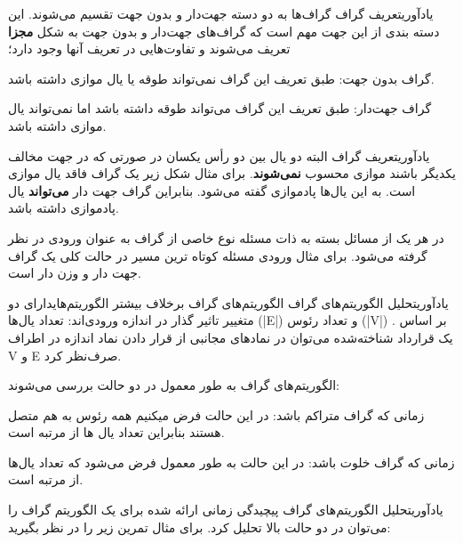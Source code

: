 \begin{itemframe-s}{یادآوری}{تعریف گراف}
\itm
گراف‌ها به دو دسته جهت‌دار و بدون جهت تقسیم می‌شوند. این دسته بندی از این جهت مهم است که گراف‌های جهت‌دار و بدون جهت به شکل \textbf{مجزا} تعریف می‌شوند و تفاوت‌هایی در تعریف آنها وجود دارد؛
\item[۱]
گراف بدون جهت: طبق تعریف این گراف نمی‌تواند طوقه یا یال موازی داشته باشد.
\item[۲]
گراف جهت‌دار: طبق تعریف این گراف می‌تواند طوقه داشته باشد اما نمی‌تواند یال موازی داشته باشد.

\end{itemframe-s}
\begin{itemframe-s}{یادآوری}{تعریف گراف}
\itm
البته دو یال بین دو رأس یکسان در صورتی که در جهت مخالف یکدیگر باشند موازی محسوب \textbf{نمی‌شوند}. برای مثال شکل زیر یک گراف فاقد یال موازی است.
\itm
 به این یال‌ها پادموازی
 گفته می‌شود. بنابراین گراف جهت دار \textbf{می‌تواند} یال پادموازی داشته باشد.

\itm
در هر یک از مسائل بسته به ذات مسئله نوع خاصی از گراف به عنوان ورودی در نظر گرفته می‌شود. برای مثال ورودی مسئله کوتاه ترین مسیر در حالت کلی یک گراف جهت دار و وزن دار است.
\end{itemframe-s}

\begin{itemframe-s}{یادآوری}{تحلیل الگوریتم‌های گراف}
\itm
الگوریتم‌های گراف برخلاف بیشتر الگوریتم‌هایدارای دو متغییر تاثیر گذار در اندازه ورودی‌اند: تعداد یال‌ها (|E|) و تعداد رئوس (|V|) .
\itm
بر اساس یک قرارداد شناخته‌شده می‌توان در نمادهای مجانبی از قرار دادن نماد اندازه در اطراف V و E صرف‌نظر ‌کرد.

\itm
الگوریتم‌های گراف به طور معمول در دو حالت بررسی می‌شوند:
\item[الف]
زمانی که گراف متراکم باشد: در این حالت فرض میکنیم همه رئوس به هم متصل هستند بنابراین تعداد یال ها از مرتبه
است.
\item[ب]
زمانی که گراف خلوت باشد:‌ در این حالت به طور معمول فرض می‌شود که تعداد یال‌ها از مرتبه
است.
\end{itemframe-s}

\begin{itemframe-s}{یادآوری}{تحلیل الگوریتم‌های گراف}
\itm
پیچیدگی زمانی ارائه شده برای یک الگوریتم گراف را می‌توان در دو حالت بالا تحلیل کرد. برای مثال تمرین زیر را در نظر بگیرید:

\end{itemframe-s}

